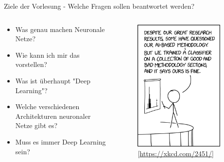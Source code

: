 \documentclass[aspectratio=1610, xcolor=dvipsnames, 9pt]{beamer}
\begin{document}
\begin{frame}{Ziele der Vorlesung - Welche Fragen sollen beantwortet werden?}
  \begin{columns}
    \begin{column}{0.69\textwidth}
      \begin{itemize}
        \item Was genau machen Neuronale Netze? \newline
        \item Wie kann ich mir das vorstellen? \newline
        \item Was ist überhaupt "Deep Learning"?  \newline
        \item Welche verschiedenen Architekturen neuronaler Netze gibt es? \newline
        \item Muss es immer Deep Learning sein? \newline
      \end{itemize}
    \end{column}
    \begin{column}{0.3\textwidth}
 \begin{figure}
 \centering
             \includegraphics[width=0.9\textwidth]{images/ai_methodology.png}
             [\url{https://xkcd.com/2451/}]
 \end{figure}
    \end{column}
  \end{columns}
\end{frame}
\end{document}
